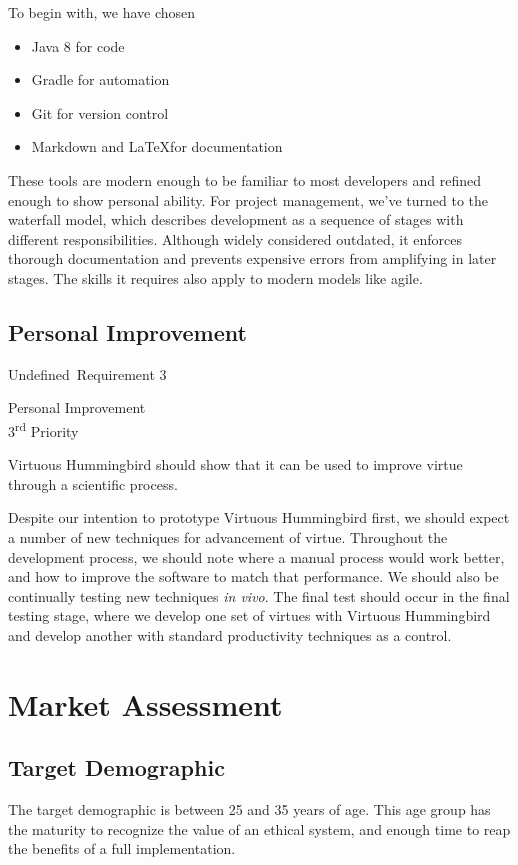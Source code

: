 \documentclass{article}
\newcommand{\requirementname}{Undefined}
\newcommand{\requirementlabel}{undefined}
\newenvironment{requirement}[2][]
    {
        \begin{mdframed}
        \label{\requirementlabel-#2}
        \vspace{2.5mm}
        \begin{center}
            {
                \large
                \requirementname\ Requirement #2
            
                #1
            }
        \end{center}
        \vspace{2.5mm}
    }
    {
        \end{mdframed}
    }
\begin{document}
To begin with, we have chosen
\begin{itemize}
    \item Java 8 for code
    \item Gradle for automation
    \item Git for version control
    \item Markdown and \LaTeX for documentation
\end{itemize}
These tools are modern enough to be familiar to most developers and refined enough to show personal ability.
For project management, we've turned to the waterfall model, which describes development as a sequence of stages with different responsibilities.
Although widely considered outdated, it enforces thorough documentation and prevents expensive errors from amplifying in later stages.
The skills it requires also apply to modern models like agile.

\subsection{Personal Improvement}

\begin{requirement}[Personal Improvement \\ 3\textsuperscript{rd} Priority]{3}
    Virtuous Hummingbird should show that it can be used to improve virtue through a scientific process.
\end{requirement}

Despite our intention to prototype Virtuous Hummingbird first, we should expect a number of new techniques for advancement of virtue.
Throughout the development process, we should note where a manual process would work better, and how to improve the software to match that performance.
We should also be continually testing new techniques \textit{in vivo}.
The final test should occur in the final testing stage, where we develop one set of virtues with Virtuous Hummingbird and develop another with standard productivity techniques as a control.

\section{Market Assessment}

\subsection{Target Demographic}

The target demographic is between 25 and 35 years of age.
This age group has the maturity to recognize the value of an ethical system, and enough time to reap the benefits of a full implementation.
\end{document}
